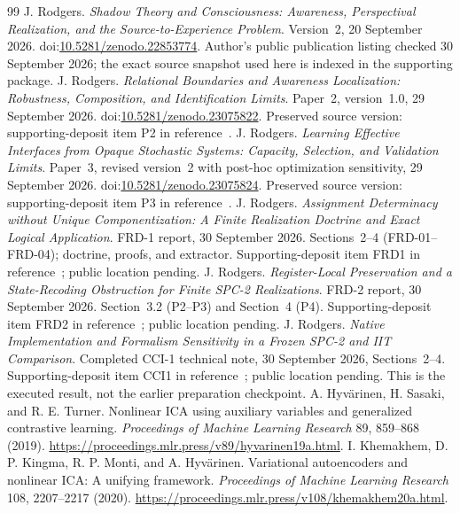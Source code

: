 \documentclass[11pt]{article}
\theoremstyle{definition}\newtheorem{definition}[theorem]{Definition}
\theoremstyle{remark}\newtheorem{remark}[theorem]{Remark}
\begin{document}
\clearpage
{\small
\begin{thebibliography}{99}
\setlength{\itemsep}{5pt}
 J. Rodgers. \emph{Shadow Theory and Consciousness: Awareness, Perspectival Realization, and the Source-to-Experience Problem}. Version~2, 20 September 2026. doi:\href{https://doi.org/10.5281/zenodo.22853774}{10.5281/zenodo.22853774}. Author's public publication listing checked 30 September 2026; the exact source snapshot used here is indexed in the supporting package.
 J. Rodgers. \emph{Relational Boundaries and Awareness Localization: Robustness, Composition, and Identification Limits}. Paper~2, version~1.0, 29 September 2026. doi:\href{https://doi.org/10.5281/zenodo.23075822}{10.5281/zenodo.23075822}. Preserved source version: supporting-deposit item P2 in reference~\cite{support}.
 J. Rodgers. \emph{Learning Effective Interfaces from Opaque Stochastic Systems: Capacity, Selection, and Validation Limits}. Paper~3, revised version~2 with post-hoc optimization sensitivity, 29 September 2026. doi:\href{https://doi.org/10.5281/zenodo.23075824}{10.5281/zenodo.23075824}. Preserved source version: supporting-deposit item P3 in reference~\cite{support}.
 J. Rodgers. \emph{Assignment Determinacy without Unique Componentization: A Finite Realization Doctrine and Exact Logical Application}. FRD-1 report, 30 September 2026. Sections~2--4 (FRD-01--FRD-04); doctrine, proofs, and extractor. Supporting-deposit item FRD1 in reference~\cite{support}; public location pending.
 J. Rodgers. \emph{Register-Local Preservation and a State-Recoding Obstruction for Finite SPC-2 Realizations}. FRD-2 report, 30 September 2026. Section~3.2 (P2--P3) and Section~4 (P4). Supporting-deposit item FRD2 in reference~\cite{support}; public location pending.
 J. Rodgers. \emph{Native Implementation and Formalism Sensitivity in a Frozen SPC-2 and IIT Comparison}. Completed CCI-1 technical note, 30 September 2026, Sections~2--4. Supporting-deposit item CCI1 in reference~\cite{support}; public location pending. This is the executed result, not the earlier preparation checkpoint.
 A. Hyv\"arinen, H. Sasaki, and R. E. Turner. Nonlinear ICA using auxiliary variables and generalized contrastive learning. \emph{Proceedings of Machine Learning Research} 89, 859--868 (2019). \url{https://proceedings.mlr.press/v89/hyvarinen19a.html}.
 I. Khemakhem, D. P. Kingma, R. P. Monti, and A. Hyv\"arinen. Variational autoencoders and nonlinear ICA: A unifying framework. \emph{Proceedings of Machine Learning Research} 108, 2207--2217 (2020). \url{https://proceedings.mlr.press/v108/khemakhem20a.html}.

\end{thebibliography}}
\end{document}
